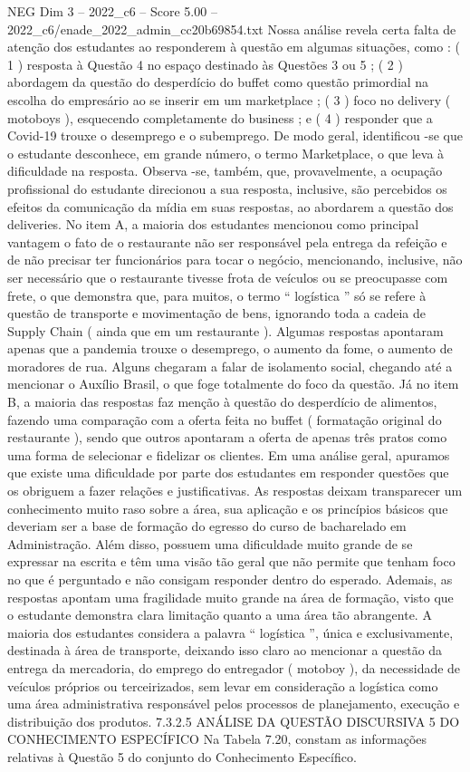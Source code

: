 \begin{textsample}{NEG Dim 3 – 2022\_c6 – Score 5.00 – 2022\_c6/enade\_2022\_admin\_cc20b69854.txt}
Nossa análise revela certa falta de atenção dos estudantes ao responderem à questão em algumas situações, como : ( 1 ) resposta à Questão 4 no espaço destinado às Questões 3 ou 5 ; ( 2 ) abordagem da questão do desperdício do buffet como questão primordial na escolha do empresário ao se inserir em um marketplace ; ( 3 ) foco no delivery ( motoboys ), esquecendo completamente do business ; e ( 4 ) responder que a Covid-19 trouxe o desemprego e o subemprego.
De modo geral, identificou -se que o estudante desconhece, em grande número, o termo Marketplace, o que leva à dificuldade na resposta.
Observa -se, também, que, provavelmente, a ocupação profissional do estudante direcionou a sua resposta, inclusive, são percebidos os efeitos da comunicação da mídia em suas respostas, ao abordarem a questão dos deliveries.
No item A, a maioria dos estudantes mencionou como principal vantagem o fato de o restaurante não ser responsável pela entrega da refeição e de não precisar ter funcionários para tocar o negócio, mencionando, inclusive, não ser necessário que o restaurante tivesse frota de veículos ou se preocupasse com frete, o que demonstra que, para muitos, o termo “ logística ” só se refere à questão de transporte e movimentação de bens, ignorando toda a cadeia de Supply Chain ( ainda que em um restaurante ).
Algumas respostas apontaram apenas que a pandemia trouxe o desemprego, o aumento da fome, o aumento de moradores de rua.
Alguns chegaram a falar de isolamento social, chegando até a mencionar o Auxílio Brasil, o que foge totalmente do foco da questão.
Já no item B, a maioria das respostas faz menção à questão do desperdício de alimentos, fazendo uma comparação com a oferta feita no buffet ( formatação original do restaurante ), sendo que outros apontaram a oferta de apenas três pratos como uma forma de selecionar e fidelizar os clientes.
Em uma análise geral, apuramos que existe uma dificuldade por parte dos estudantes em responder questões que os obriguem a fazer relações e justificativas.
As respostas deixam transparecer um conhecimento muito raso sobre a área, sua aplicação e os princípios básicos que deveriam ser a base de formação do egresso do curso de bacharelado em Administração.
Além disso, possuem uma dificuldade muito grande de se expressar na escrita e têm uma visão tão geral que não permite que tenham foco no que é perguntado e não consigam responder dentro do esperado.
Ademais, as respostas apontam uma fragilidade muito grande na área de formação, visto que o estudante demonstra clara limitação quanto a uma área tão abrangente.
A maioria dos estudantes considera a palavra “ logística ”, única e exclusivamente, destinada à área de transporte, deixando isso claro ao mencionar a questão da entrega da mercadoria, do emprego do entregador ( motoboy ), da necessidade de veículos próprios ou terceirizados, sem levar em consideração a logística como uma área administrativa responsável pelos processos de planejamento, execução e distribuição dos produtos. 7.3.2.5 ANÁLISE DA QUESTÃO DISCURSIVA 5 DO CONHECIMENTO ESPECÍFICO Na Tabela 7.20, constam as informações relativas à Questão 5 do conjunto do Conhecimento Específico.

\end{textsample}

